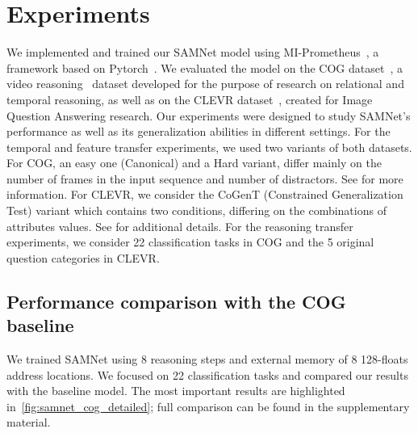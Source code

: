 \section{Experiments}
\label{sec:experiments}
We implemented and trained our SAMNet model using MI-Prometheus~\cite{kornuta2018accelerating}, a framework based on Pytorch~\cite{paszke2017automatic}. We evaluated the model on the COG dataset~\cite{yang2018dataset}, a video reasoning~\cite{mogadala2019trends} dataset developed for the purpose of research on relational and temporal reasoning, as well as on the CLEVR dataset~\cite{johnson2017clevr}, created for Image Question Answering research.
Our experiments were designed to study SAMNet's performance as well as its generalization abilities in different settings.
For the temporal and feature transfer experiments, we used two variants of both datasets.
For COG, an easy one (Canonical) and a Hard variant, differ mainly on the number of frames in the input sequence and number of distractors. See  for more information.
For CLEVR, we consider the CoGenT (Constrained Generalization Test) variant which contains two conditions, differing on the combinations of attributes values. See  for additional details.
For the reasoning transfer experiments, we consider 22 classification tasks in COG and the 5 original question categories in CLEVR.

\subsection{Performance comparison with the COG baseline}
\label{sec:cog-baseline-compare}

We trained SAMNet using 8 reasoning steps and external memory of 8 128-floats address locations.
We focused on 22 classification tasks and compared our results with the baseline model.
The most important results are highlighted in~\cref{fig:samnet_cog_detailed}; full comparison can be found in the supplementary material.%


